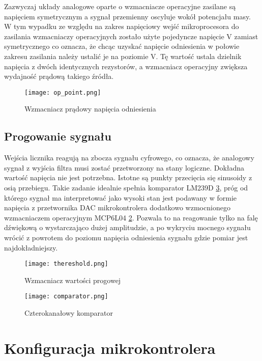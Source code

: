 Zazwyczaj układy analogowe oparte o wzmacniacze operacyjne zasilane są napięciem symetrycznym a sygnał przemienny oscyluje wokół potencjału masy. 
W tym wypadku ze względu na zakres napięciowy wejść mikroprocesora do zasilania wzmacniaczy operacyjnych 
zostało użyte pojedyncze napięcie \unit[3,3]{V} zamiast symetrycznego co oznacza, 
że chcąc uzyskać napięcie odniesienia w połowie zakresu zasilania należy ustalić je na poziomie \unit[1,65]{V}. 
Tę wartość ustala dzielnik napięcia z dwóch identycznych rezystorów,
a wzmacniacz operacyjny zwiększa wydajność prądową takiego źródła. 
\begin{figure}[ht!]
    \centering
    \texttt{[image: op\_point.png]}
    \caption{Wzmacniacz prądowy napięcia odniesienia}
    \label{fig:op_point}
\end{figure}

\subsection{Progowanie sygnału}
Wejścia licznika reagują na zbocza sygnału cyfrowego, co oznacza, że analogowy sygnał z wyjścia filtra musi zostać przetworzony na stany logiczne.
Dokładna wartość napięcia nie jest potrzebna. Istotne są punkty przecięcia się sinusoidy z osią przebiegu.
Takie zadanie idealnie spełnia komparator LM239D \ref{fig:comparator}, próg od którego sygnał ma interpretować jako wysoki stan jest podawany w formie 
napięcia z przetwornika DAC mikrokontrolera dodatkowo wzmocnionego wzmacniaczem operacyjnym MCP6L04 \ref{fig:thereshold}.
Pozwala to na reagowanie tylko na falę dźwiękową o wystarczająco dużej amplitudzie, 
a po wykryciu mocnego sygnału wrócić z powrotem do poziomu napięcia odniesienia sygnału gdzie pomiar jest najdokładniejszy.

\begin{figure}[ht!]
    \centering
    \texttt{[image: thereshold.png]}
    \caption{Wzmacniacz wartości progowej}
    \label{fig:thereshold}
\end{figure}

\begin{figure}[ht!]
    \centering
    \texttt{[image: comparator.png]}
    \caption{Czterokanałowy komparator}
    \label{fig:comparator}
\end{figure}

\section{Konfiguracja mikrokontrolera}

